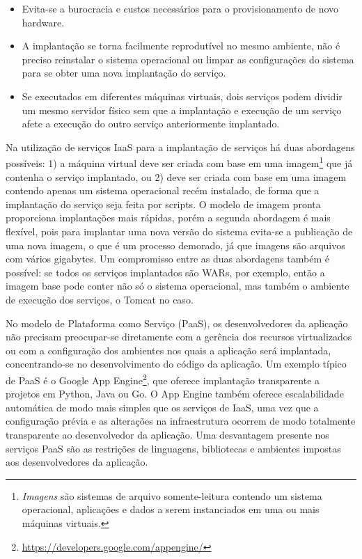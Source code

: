 \begin{itemize}
\item Evita-se a burocracia e custos necessários para o provisionamento de novo hardware.
\item A implantação se torna facilmente reprodutível no mesmo ambiente, não é preciso reinstalar o sistema operacional ou limpar as configurações do sistema para se obter uma nova implantação do serviço.
\item Se executados em diferentes máquinas virtuais, dois serviços podem dividir um mesmo servidor físico sem que a implantação e execução de um serviço afete a execução do outro serviço anteriormente implantado.
\end{itemize}

Na utilização de serviços IaaS para a implantação de serviços há duas abordagens possíveis:
1) a máquina virtual deve ser criada com base em uma 
imagem\footnote{\emph{Imagens} são sistemas de arquivo somente-leitura contendo um sistema operacional, aplicações e dados a serem instanciados em uma ou mais máquinas virtuais.} 
que já contenha
o serviço implantado, ou 2) deve ser criada com base em uma imagem contendo apenas um
sistema operacional recém instalado, de forma que a implantação do serviço seja feita
por scripts. O modelo de imagem pronta proporciona implantações mais rápidas,
porém a segunda abordagem é mais flexível, pois para implantar uma nova versão do sistema
evita-se a publicação de uma nova imagem, o que é um processo demorado,
já que imagens são arquivos com vários gigabytes.
Um compromisso entre as duas abordagens também é possível:
se todos os serviços implantados são WARs, por exemplo, então a imagem base
pode conter não só o sistema operacional, mas também o ambiente de execução
dos serviços, o Tomcat no caso.

No modelo de Plataforma como Serviço (PaaS), os desenvolvedores da aplicação não precisam preocupar-se diretamente com a gerência dos recursos virtualizados ou com a configuração dos ambientes nos quais a aplicação será implantada, concentrando-se no desenvolvimento do código da aplicação.
Um exemplo típico de PaaS é o Google App Engine\footnote{\url{https://developers.google.com/appengine/}}, que oferece implantação transparente a projetos em Python, Java ou Go. O App Engine também oferece escalabilidade automática de modo mais simples que os serviços de IaaS, uma vez que a configuração prévia e as alterações na infraestrutura ocorrem de modo totalmente transparente ao desenvolvedor da aplicação. Uma desvantagem presente nos serviços PaaS são as restrições de linguagens, bibliotecas e ambientes impostas aos desenvolvedores da aplicação.

